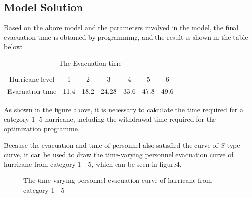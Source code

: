 \documentclass{mcmthesis}
\begin{document}
\subsection{Model Solution}
Based on the above model and the parameters involved in the model, the final evacuation time is obtained by programming, and the result is shown in the table below:
\begin{table}[!htbp]
  \centering
  \setlength{\abovecaptionskip}{0pt}%
  \setlength{\belowcaptionskip}{10pt}%
  \caption{The Evacuation time}
  \begin{tabular}{ccccccc}
    \toprule[1.5pt]
    Hurricane level & 1    & 2    & 3     & 4    & 5    & 6    \\
    Evacuation time & 11.4 & 18.2 & 24.28 & 33.6 & 47.8 & 49.6 \\
    \bottomrule[1.5pt]
  \end{tabular}
\end{table}



As shown in the figure above, it is necessary to calculate the time required for a category 1- 5 hurricane, including the withdrawal time required for the optimization programme.

Because the evacuation and time of personnel also satisfied the curve of $S$ type curve, it can be used to draw the time-varying personnel evacuation curve of hurricane from category 1 - 5, which can be seen in figure4.

\begin{figure}[!htbp]
  \caption{The time-varying personnel evacuation curve of hurricane from category 1 - 5}\label{figure4}
\end{figure}
\end{document}
